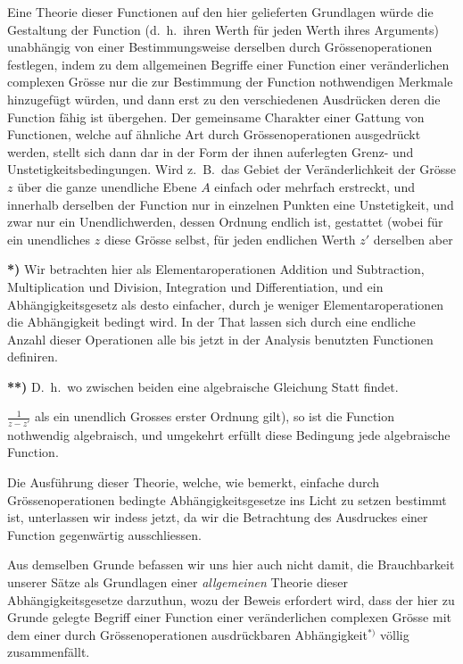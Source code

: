 \documentclass{article}
\begin{document}
Eine Theorie dieser Functionen auf den hier gelieferten Grundlagen würde die Gestaltung der Function (d.\ h.\ ihren Werth für jeden Werth ihres Arguments) unabhängig von einer Bestimmungsweise derselben durch Grössenoperationen festlegen, indem zu dem allgemeinen Begriffe einer Function einer veränderlichen complexen Grösse nur die zur Bestimmung der Function nothwendigen Merkmale hinzugefügt würden, und dann erst zu den verschiedenen Ausdrücken deren die Function fähig ist übergehen. Der gemeinsame Charakter einer Gattung von Functionen, welche auf ähnliche Art durch Grössenoperationen ausgedrückt werden, stellt sich dann dar in der Form der ihnen auferlegten Grenz- und Unstetigkeitsbedingungen. Wird z.\ B.\ das Gebiet der Veränderlichkeit der Grösse $z$ über die ganze unendliche Ebene $A$ einfach oder mehrfach erstreckt, und innerhalb derselben der Function nur in einzelnen Punkten eine Unstetigkeit, und zwar nur ein Unendlichwerden, dessen Ordnung endlich ist, gestattet (wobei für ein unendliches $z$ diese Grösse selbst, für jeden endlichen Werth $z'$ derselben aber

\textbf{*)} Wir betrachten hier als Elementaroperationen Addition und Subtraction, Multiplication und Division, Integration und Differentiation, und ein Abhängigkeitsgesetz als desto einfacher, durch je weniger Elementaroperationen die Abhängigkeit bedingt wird. In der That lassen sich durch eine endliche Anzahl dieser Operationen alle bis jetzt in der Analysis benutzten Functionen definiren.

\textbf{**)} D.\ h.\ wo zwischen beiden eine algebraische Gleichung Statt findet.

$\frac{1}{z - z'}$ als ein unendlich Grosses erster Ordnung gilt), so ist die Function nothwendig algebraisch, und umgekehrt erfüllt diese Bedingung jede algebraische Function.

Die Ausführung dieser Theorie, welche, wie bemerkt, einfache durch Grössenoperationen bedingte Abhängigkeitsgesetze ins Licht zu setzen bestimmt ist, unterlassen wir indess jetzt, da wir die Betrachtung des Ausdruckes einer Function gegenwärtig ausschliessen.

Aus demselben Grunde befassen wir uns hier auch nicht damit, die Brauchbarkeit unserer Sätze als Grundlagen einer \emph{allgemeinen} Theorie dieser Abhängigkeitsgesetze darzuthun, wozu der Beweis erfordert wird, dass der hier zu Grunde gelegte Begriff einer Function einer veränderlichen complexen Grösse mit dem einer durch Grössenoperationen ausdrückbaren Abhängigkeit${}^{*)}$ völlig zusammenfällt.
\end{document}

